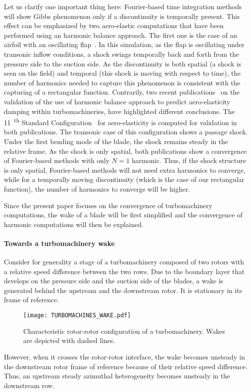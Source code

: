 Let us clarify one important thing here: Fourier-based time integration methods
will show Gibbs phenomenon only if a discontinuity is temporally
present.
This effect can be emphasized by two 
aero-elastic computations that have been performed 
using an harmonic
balance approach. The first one is the case of 
an airfoil with an oscillating 
flap~\cite{JDufour2009}. In this simulation, as the flap is oscillating
under transonic inflow conditions, a shock swings temporally
back and forth from the pressure side to the
suction side. As the discontinuity is
both spatial (a shock is seen on the field) and temporal
(this shock is moving with respect to time), the number
of harmonics needed to capture this phenomenon is
consistent with the capturing of a rectangular function.
Contrarily, two recent publications~\cite{Huang2013, JSicot2012} on the validation
of the use of harmonic balance approach to predict
aero-elasticity damping within turbomachineries, have highlighted
different conclusions. The 11~\textsuperscript{th}
Standard Configuration~\cite{Fransson1999} for aero-elasticity is computed
for validation in both publications. The transonic case
of this configuration shows a passage shock. Under the first bending mode
of the blade, the shock remains steady in the relative frame. As the shock
is only spatial, both publications show a convergence of 
Fourier-based methods with only $N=1$ harmonic. Thus, if the shock
structure is only spatial, Fourier-based methods will not need
extra harmonics to converge, while for a temporally moving discontinuity
(which is the case of our rectangular function), the number
of harmonics to converge will be higher.

Since the present paper focuses on the convergence of turbomachinery
computations, the wake of a blade will be first
simplified and the convergence of harmonic computations will then be
explained.

\paragraph{Towards a turbomachinery wake}
\label{sec:turbomachine_wake}

Consider for generality a stage of a turbomachinery composed of two rotors
with a relative speed difference between the two rows.
Due to the boundary layer that develops on 
the pressure side and the suction side of the blades, a wake is generated behind
the upstream and the downstream rotor. It is stationary in its frame of reference.
\begin{figure}[htb]
    \centering\texttt{[image: TURBOMACHINES\_WAKE.pdf]}
  \caption{Characteristic rotor-rotor configuration of a turbomachinery. 
  Wakes are depicted with dashed lines.}
  \label{fig:rotor-stator}
\end{figure}
However, when it crosses the rotor-rotor interface,
the wake becomes unsteady in the downstream rotor frame of reference
because of their relative speed difference. Thus, 
an upstream steady azimuthal heterogeneity becomes unsteady in
the downstream row.


